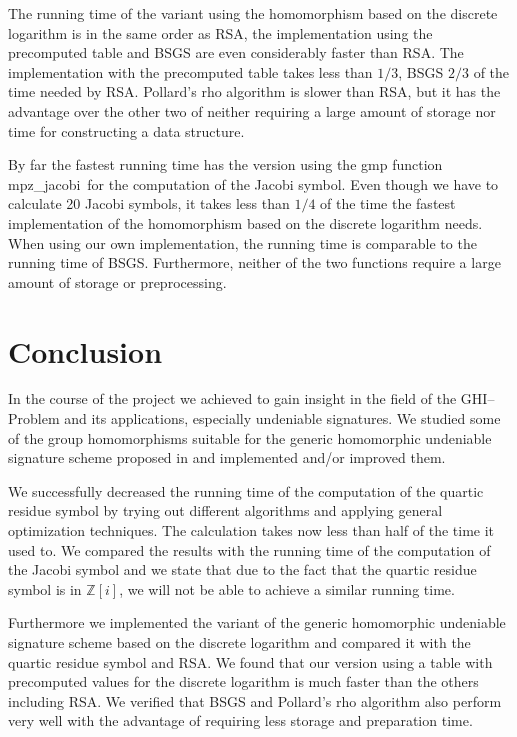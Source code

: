 \documentclass[a4paper, 11pt]{article}
\begin{document}
 The running time of the variant using the homomorphism based on the discrete logarithm is in the same order as RSA, the implementation using the precomputed table and BSGS are even considerably faster than RSA. The implementation with the precomputed table takes less than $1/3$, BSGS $2/3$ of the time needed by RSA. Pollard's rho algorithm is slower than RSA, but it has the advantage over the other two of neither requiring a large amount of storage nor time for constructing a data structure. 
 
 By far the fastest running time has the version using the gmp function \ttfamily mpz\_jacobi\normalfont ~for the computation of the Jacobi symbol. Even though we have to calculate 20 Jacobi symbols, it takes less than  $1/4$ of the time the fastest implementation of the homomorphism based on the discrete logarithm needs. When using our own implementation, the running time is comparable to the running time of BSGS. Furthermore, neither of the two functions require a large amount of storage or preprocessing. 
 
 \section{Conclusion} 
 In the course of the project we achieved to gain insight in the field of the GHI--Problem and its applications, especially undeniable signatures. We studied some of the group homomorphisms suitable for the generic homomorphic undeniable signature scheme proposed in \cite{genMOVA} and implemented and/or improved them. 
 
 We successfully decreased the running time of the computation of the quartic residue symbol by trying out different algorithms and applying general optimization techniques. The calculation takes now less than half of the time it used to. We compared the results with the running time of the computation of the Jacobi symbol and we state that due to the fact that the quartic residue symbol is in $\mathbb{Z}[i]$, we will not be able to achieve a similar running time. 
 
 Furthermore we implemented the variant of the generic homomorphic undeniable signature scheme based on the discrete logarithm and compared it with the quartic residue symbol and RSA. We found that our version using a table with precomputed values for the discrete logarithm is much faster than the others including RSA. We verified that BSGS and Pollard's rho algorithm also perform very well with the advantage of requiring less storage and preparation time. 
 
\end{document}
